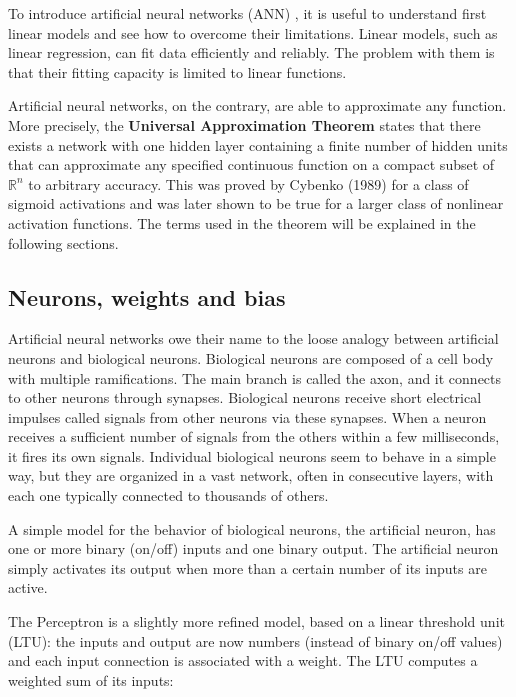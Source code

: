 To introduce artificial neural networks (ANN) \cite{Goodfellow-et-al-2016}, it is useful to understand first linear models and see how to overcome their limitations. Linear models, such as linear regression, can fit data efficiently and reliably. The problem with them is that their fitting capacity is limited to linear functions.

Artificial neural networks, on the contrary, are able to approximate any function. More precisely, the \textbf{Universal Approximation Theorem} \cite{prince2023understanding} states that there exists a network with one hidden layer containing a finite number of hidden units that can approximate any specified continuous function on a compact subset of $\mathbb{R}^n$ to arbitrary accuracy. This was proved by Cybenko (1989) for a class of sigmoid activations and was later shown to be true for a larger class of nonlinear activation functions. The terms used in the theorem will be explained in the following sections.


\subsection{Neurons, weights and bias}
\label{subsec:neurons}

Artificial neural networks owe their name to the loose analogy between artificial neurons and biological neurons.
Biological neurons \cite{geron2022hands} are composed of a cell body with multiple ramifications. The main branch is called the axon, and it connects to other neurons through synapses. Biological neurons receive short electrical impulses called signals from other neurons via these synapses. When a neuron receives a sufficient number of signals from the others within a few milliseconds, it fires its own signals. Individual biological neurons seem to behave in a simple way, but they are organized in a vast network, often in consecutive layers, with each one typically connected to thousands of others.

A simple model for the behavior of biological neurons, the artificial neuron, has one or more binary (on/off) inputs and one binary output. The artificial neuron simply activates its output when more than a certain number of its inputs are active.

The Perceptron is a slightly more refined model, based on a linear threshold unit (LTU): the inputs and output are now numbers (instead of binary on/off values) and each input connection is associated with a weight. The LTU computes a weighted sum of its inputs:

